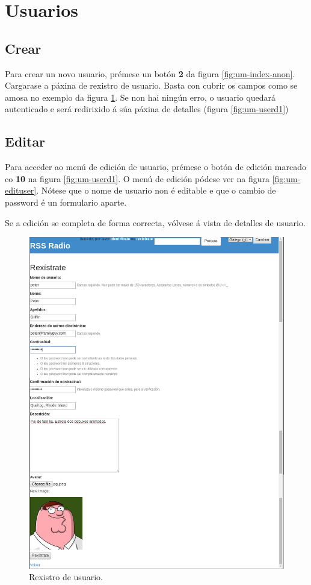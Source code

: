 \section{Usuarios}

\subsection{Crear}
Para crear un novo usuario, prémese un botón \textbf{2} da figura \ref{fig:um-index-anon}. Cargarase a páxina de rexistro de usuario. Basta con cubrir os campos como se amosa no exemplo da figura \ref{fig:um-signup}. Se non hai ningún erro, o usuario quedará autenticado e será redirixido á súa páxina de detalles (figura \ref{fig:um-userd1})

\subsection{Editar}
Para acceder ao menú de edición de usuario, prémese o botón de edición marcado co \textbf{10} na figura \ref{fig:um-userd1}. O menú de edición pódese ver na figura \ref{fig:um-edituser}. Nótese que o nome de usuario non é editable e que o cambio de password é un formulario aparte.

Se a edición se completa de forma correcta, vólvese á vista de detalles de usuario.

\begin{figure}[h]
	\centering
	\includegraphics[scale=0.43,keepaspectratio=true]{./images/usermanual/um-signup.png}
	\caption{Rexistro de usuario.}
	\label{fig:um-signup}
\end{figure}

